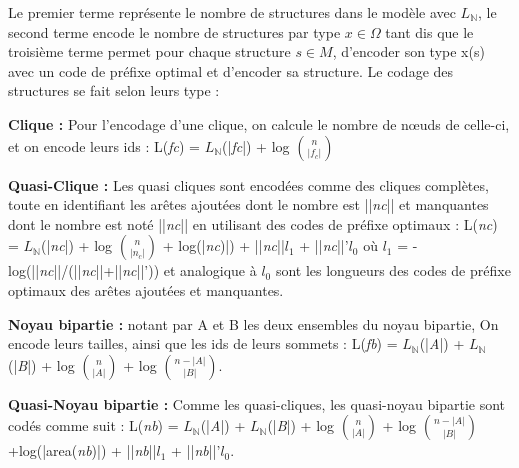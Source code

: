 Le premier terme représente le nombre de structures dans le modèle avec $L_{\mathbb{N}}$, le second terme encode le nombre de structures par type $x \in \Omega$ tant dis que le troisième terme permet  pour chaque structure $s \in \textit{M}$, d'encoder son type x(s) avec un code de préfixe optimal et d'encoder sa structure. Le codage des structures se fait selon leurs type :

\textbf{Clique :} Pour l'encodage d'une clique, on calcule le nombre de nœuds de celle-ci, et on encode leurs ids :
L(\textit{fc}) = $L_{\mathbb{N}}$(|\textit{fc}|) + log ${n}\choose{|f_{c}|}$

\textbf{Quasi-Clique :} Les quasi cliques sont encodées comme des cliques complètes, toute en identifiant les arêtes ajoutées dont le nombre est ||\textit{nc}|| et manquantes dont le nombre est noté ||\textit{nc}|| en utilisant des codes de préfixe optimaux : 
L(\textit{nc}) = $L_{\mathbb{N}}$(|\textit{nc}|) + log ${n}\choose{|n_{c}|}$ + log(|\textit{nc})|) + ||\textit{nc}||\textit{$l_{1}$} +  ||\textit{nc}||'\textit{$l_{0}$}
où \textit{$l_{1}$} = - log(||\textit{nc}||/(||\textit{nc}||+||\textit{nc}||')) et analogique à \textit{$l_{0}$} sont les longueurs des codes de préfixe optimaux des arêtes  ajoutées et manquantes.

\textbf{Noyau bipartie :} notant par A et B les deux ensembles du noyau bipartie, On encode leurs tailles, ainsi que les ids de leurs sommets : 
L(\textit{fb}) = $L_{\mathbb{N}}$(|\textit{A}|) + $L_{\mathbb{N}}$(|\textit{B}|) + log ${n}\choose{|A|}$ + log ${n-|A|}\choose{|B|}$.

\textbf{Quasi-Noyau bipartie :} Comme les quasi-cliques, les quasi-noyau bipartie sont codés comme suit :
L(\textit{nb}) = $L_{\mathbb{N}}$(|\textit{A}|) + $L_{\mathbb{N}}$(|\textit{B}|) + log ${n}\choose{|A|}$  + log ${n-|A|}\choose{|B|}$+log(|area(\textit{nb})|) + ||\textit{nb}||\textit{$l_{1}$} + ||\textit{nb}||'\textit{$l_{0}$}.

